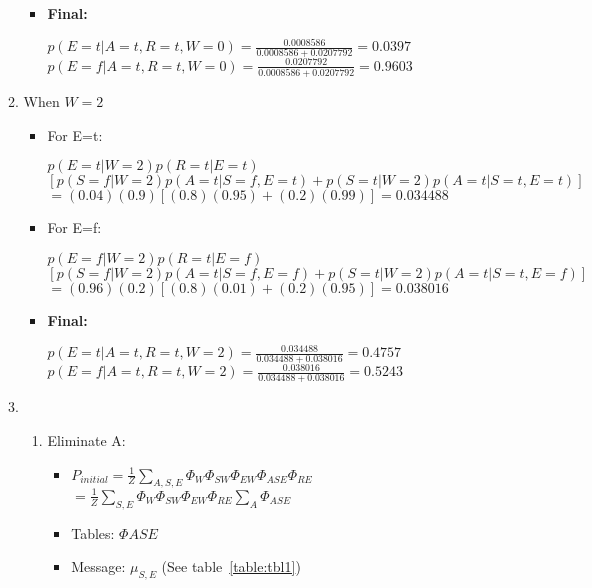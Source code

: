 \documentclass{article}
\begin{document}
\begin{enumerate}[label=(\alph*)]
\begin{enumerate}[label=\roman*.]
\begin{itemize}
\item \textbf{Final:}

$p(E=t|A=t,R=t,W=0)=\frac{0.0008586}{0.0008586+0.0207792}=0.0397$ \\

$p(E=f|A=t,R=t,W=0)=\frac{0.0207792}{0.0008586+0.0207792}=0.9603$

\end{itemize}

\item When $W=2$

\begin{itemize}

\item For E=t:

$p(E=t|W=2)p(R=t|E=t)$ \\ $[p(S=f|W=2)p(A=t|S=f,E=t)+p(S=t|W=2)p(A=t|S=t,E=t)]$ \\
$=(0.04)(0.9)[(0.8)(0.95)+(0.2)(0.99)]=0.034488$

\item For E=f:

$p(E=f|W=2)p(R=t|E=f)$ \\ $[p(S=f|W=2)p(A=t|S=f,E=f)+p(S=t|W=2)p(A=t|S=t,E=f)]$ \\
$=(0.96)(0.2)[(0.8)(0.01)+(0.2)(0.95)]=0.038016$

\item \textbf{Final:}

$p(E=t|A=t,R=t,W=2)=\frac{0.034488}{0.034488+0.038016}=0.4757$ \\
$p(E=f|A=t,R=t,W=2)=\frac{0.038016}{0.034488+0.038016}=0.5243$

\end{itemize}

\item

\begin{enumerate}[label=\alph*.]

\item Eliminate A:

\begin{itemize}

\item $P_{initial}=\frac{1}{Z}\sum_{A,S,E}\Phi_{W}\Phi_{SW}\Phi_{EW}\Phi_{ASE}\Phi_{RE}$ 
$=\frac{1}{Z}\sum_{S,E}\Phi_{W}\Phi_{SW}\Phi_{EW}\Phi_{RE}\sum_A\Phi_{ASE}$

\item Tables: $\Phi{ASE}$

\item Message: $\mu_{S,E}$ (See table~\ref{table:tbl1})


\end{itemize}
\end{enumerate}
\end{enumerate}
\end{enumerate}
\end{document}
